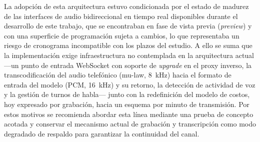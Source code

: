 La adopción de esta arquitectura estuvo condicionada por el estado de madurez de las interfaces de audio bidireccional en tiempo real disponibles durante el desarrollo de este trabajo, que se encontraban en fase de vista previa (\emph{preview}) y con una superficie de programación sujeta a cambios, lo que representaba un riesgo de cronograma incompatible con los plazos del estudio. A ello se suma que la implementación exige infraestructura no contemplada en la arquitectura actual ---un punto de entrada WebSocket con soporte de \emph{upgrade} en el proxy inverso, la transcodificación del audio telefónico (mu-law, 8~kHz) hacia el formato de entrada del modelo (PCM, 16~kHz) y su retorno, la detección de actividad de voz y la gestión de turnos de habla--- junto con la redefinición del modelo de costos, hoy expresado por grabación, hacia un esquema por minuto de transmisión. Por estos motivos se recomienda abordar esta línea mediante una prueba de concepto acotada y conservar el mecanismo actual de grabación y transcripción como modo degradado de respaldo para garantizar la continuidad del canal.

\newpage
